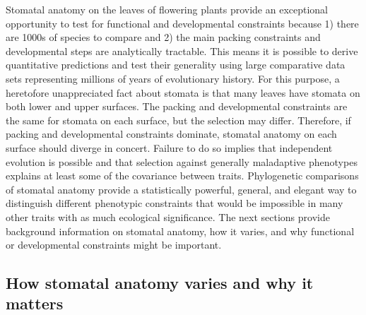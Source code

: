 \documentclass[
  12pt,
]{article}
\begin{document}
Stomatal anatomy on the leaves of flowering plants provide an exceptional opportunity to test for functional and developmental constraints because 1) there are 1000s of species to compare and 2) the main packing constraints and developmental steps are analytically tractable. This means it is possible to derive quantitative predictions and test their generality using large comparative data sets representing millions of years of evolutionary history. For this purpose, a heretofore unappreciated fact about stomata is that many leaves have stomata on both lower and upper surfaces. The packing and developmental constraints are the same for stomata on each surface, but the selection may differ. Therefore, if packing and developmental constraints dominate, stomatal anatomy on each surface should diverge in concert. Failure to do so implies that independent evolution is possible and that selection against generally maladaptive phenotypes explains at least some of the covariance between traits. Phylogenetic comparisons of stomatal anatomy provide a statistically powerful, general, and elegant way to distinguish different phenotypic constraints that would be impossible in many other traits with as much ecological significance. The next sections provide background information on stomatal anatomy, how it varies, and why functional or developmental constraints might be important.

\hypertarget{how-stomatal-anatomy-varies-and-why-it-matters}{%
\subsection{How stomatal anatomy varies and why it matters}\label{how-stomatal-anatomy-varies-and-why-it-matters}}
\end{document}
